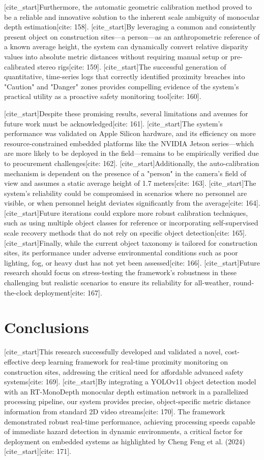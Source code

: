 [cite_start]Furthermore, the automatic geometric calibration method proved to be a reliable and innovative solution to the inherent scale ambiguity of monocular depth estimation[cite: 158]. [cite_start]By leveraging a common and consistently present object on construction sites—a person—as an anthropometric reference of a known average height, the system can dynamically convert relative disparity values into absolute metric distances without requiring manual setup or pre-calibrated stereo rigs[cite: 159]. [cite_start]The successful generation of quantitative, time-series logs that correctly identified proximity breaches into "Caution" and "Danger" zones provides compelling evidence of the system's practical utility as a proactive safety monitoring tool[cite: 160].

[cite_start]Despite these promising results, several limitations and avenues for future work must be acknowledged[cite: 161]. [cite_start]The system's performance was validated on Apple Silicon hardware, and its efficiency on more resource-constrained embedded platforms like the NVIDIA Jetson series—which are more likely to be deployed in the field—remains to be empirically verified due to procurement challenges[cite: 162]. [cite_start]Additionally, the auto-calibration mechanism is dependent on the presence of a "person" in the camera's field of view and assumes a static average height of 1.7 meters[cite: 163]. [cite_start]The system's reliability could be compromised in scenarios where no personnel are visible, or when personnel height deviates significantly from the average[cite: 164]. [cite_start]Future iterations could explore more robust calibration techniques, such as using multiple object classes for reference or incorporating self-supervised scale recovery methods that do not rely on specific object detection[cite: 165]. [cite_start]Finally, while the current object taxonomy is tailored for construction sites, its performance under adverse environmental conditions such as poor lighting, fog, or heavy dust has not yet been assessed[cite: 166]. [cite_start]Future research should focus on stress-testing the framework's robustness in these challenging but realistic scenarios to ensure its reliability for all-weather, round-the-clock deployment[cite: 167].

\section{Conclusions}
[cite_start]This research successfully developed and validated a novel, cost-effective deep learning framework for real-time proximity monitoring on construction sites, addressing the critical need for affordable advanced safety systems[cite: 169]. [cite_start]By integrating a YOLOv11 object detection model with an RT-MonoDepth monocular depth estimation network in a parallelized processing pipeline, our system provides precise, object-specific metric distance information from standard 2D video streams[cite: 170]. The framework demonstrated robust real-time performance, achieving processing speeds capable of immediate hazard detection in dynamic environments, a critical factor for deployment on embedded systems as highlighted by Cheng Feng et al. (2024) [cite_start][cite: 171].

